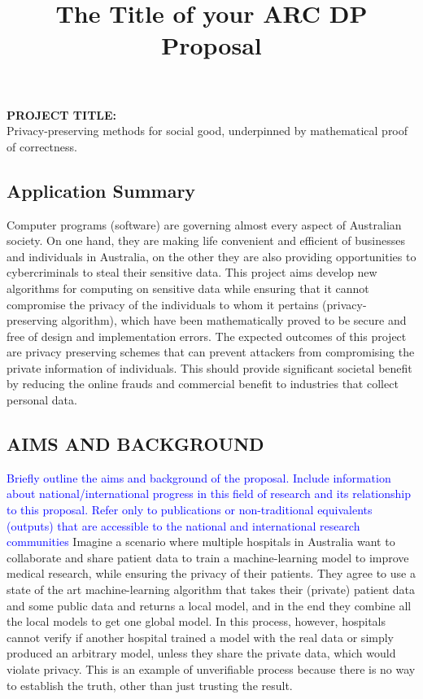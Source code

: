 \documentclass[12pt,a4paper]{article}
\date{}
\title{The Title of your ARC DP Proposal}
\date{} %
\newcommand{\rules}[1]{\textcolor{blue}{#1}}
\newcommand*{\TitleFont}{%
      \usefont{\encodingdefault}{\rmdefault}{b}{n}%
      \fontsize{12}{12}%
      \selectfont}
\begin{document}
\rmfamily
\date{}


\noindent \textbf{PROJECT TITLE: }\\ \noindent Privacy-preserving methods for 
social good, underpinned by mathematical proof of correctness.





\subsection*{Application Summary}
Computer programs (software) are governing almost every aspect of Australian society. 
On one hand, they are making life convenient and efficient of 
businesses and individuals in Australia, on the other they 
are also providing opportunities to cybercriminals to steal their sensitive data. 
This project aims develop new algorithms for computing on sensitive data  
while ensuring that it cannot compromise the 
privacy of the individuals to whom it pertains (privacy-preserving algorithm), 
which have been mathematically proved to be secure and free of design and implementation errors. 
The expected outcomes of this project are  privacy preserving schemes that can prevent attackers 
from compromising the private information of individuals.
This should provide significant societal benefit by reducing the online frauds 
and commercial benefit to industries that collect personal data. 



\subsection*{\TitleFont AIMS AND BACKGROUND}
\rules{ Briefly outline the aims and background of the proposal.  Include information about 
national/international progress in this field of research and its relationship to this 
proposal. Refer only to publications or non-traditional equivalents (outputs) that are accessible 
to the national and international research communities}
Imagine a scenario where multiple hospitals in Australia want to collaborate and 
share patient data to train a machine-learning model to improve medical research,
while ensuring the privacy of their patients. They agree to use 
a state of the art machine-learning algorithm that takes 
their (private) patient data and some public data and returns 
a local model, and in the end they combine all 
the local models to get one global model. 
In this process, however, hospitals cannot verify if another hospital trained a model 
with  the real data or simply produced an arbitrary model, unless they share the private data, 
which would violate privacy. This is an example of 
unverifiable process because there is no way to establish the truth, 
other than just trusting the result. 
\end{document}
